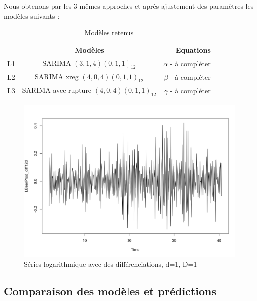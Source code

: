\documentclass[12pt,a4paper]{book}
\newcommand{\1}{\mathds{1}}
\begin{document}
Nous obtenons par les 3 mêmes approches et après ajustement des paramètres les modèles suivants : 

\begin{table}[h!]
  \begin{center}
    \caption{Modèles retenus}
    \label{tab:table1}
    \begin{tabular}{l|c|r} %
      \ & \textbf{Modèles} & \textbf{Equations}\\
      \hline
      L1 & SARIMA $(3,1,4)(0,1,1)_{12}$ & $\alpha$ - à compléter\\
      L2& SARIMA xreg $(4,0,4)(0,1,1)_{12}$& $\beta$ - à compléter\\
      L3 & SARIMA avec rupture $(4,0,4)(0,1,1)_{12}$ & $\gamma$ - à compléter\\
    \end{tabular}
  \end{center}
\end{table}


\begin{figure}[h]
 \centering
  \includegraphics[scale=0.3]{Log_Avecd1D1}  
\caption{Séries logarithmique avec des différenciations, d=1, D=1 }
\label{fig:1}
\end{figure}



\vspace{5 mm}
\subsection{Comparaison des modèles et prédictions}
\end{document}
